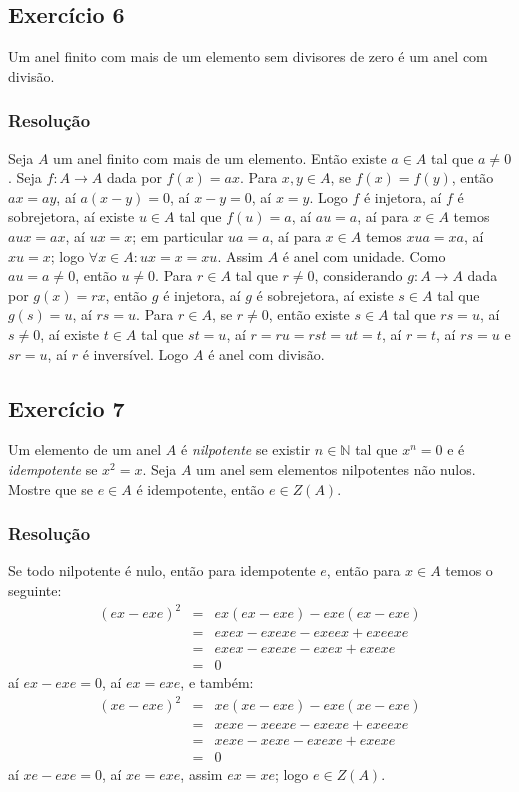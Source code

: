 \documentclass[10pt,a4paper]{article}
\begin{document}
\subsection*{Exercício 6}

Um anel finito com mais de um elemento sem divisores de zero é um anel com divisão.

\subsubsection*{Resolução}

Seja $A$ um anel finito com mais de um elemento. Então existe $a\in A$ tal que $a\neq 0$. Seja $f:A\rightarrow A$ dada por $f(x)=ax$. Para $x,y\in A$, se $f(x)=f(y)$, então $ax=ay$, aí $a(x-y)=0$, aí $x-y=0$, aí $x=y$. Logo $f$ é injetora, aí $f$ é sobrejetora, aí existe $u\in A$ tal que $f(u)=a$, aí $au=a$, aí para $x\in A$ temos $aux=ax$, aí $ux=x$; em particular $ua=a$, aí para $x\in A$ temos $xua=xa$, aí $xu=x$; logo $\forall x\in A:ux=x=xu$. Assim $A$ é anel com unidade. Como $au=a\neq0$, então $u\neq 0$. Para $r\in A$ tal que $r\neq 0$, considerando $g:A\rightarrow A$ dada por $g(x)=rx$, então $g$ é injetora, aí $g$ é sobrejetora, aí existe $s\in A$ tal que $g(s)=u$, aí $rs=u$. Para $r\in A$, se $r\neq 0$, então existe $s\in A$ tal que $rs=u$, aí $s\neq 0$, aí existe $t\in A$ tal que $st=u$, aí $r=ru=rst=ut=t$, aí $r=t$, aí $rs=u$ e $sr=u$, aí $r$ é inversível. Logo $A$ é anel com divisão.

\newpage

\subsection*{Exercício 7}
Um elemento de um anel $A$ é \textit{nilpotente} se existir $n\in\mathbb{N}$ tal que $x^n=0$ e é \textit{idempotente} se $x^2=x$. Seja $A$ um anel sem elementos nilpotentes não nulos. Mostre que se $e\in A$ é idempotente, então $e\in Z(A)$.

\subsubsection*{Resolução}

Se todo nilpotente é nulo, então para idempotente $e$, então para $x\in A$ temos o seguinte:
\[
\begin{array}{rcl}
(ex-exe)^2&=&ex(ex-exe)-exe(ex-exe)\\&=&exex-exexe-exeex+exeexe\\&=&exex-exexe-exex+exexe\\&=&0
\end{array}
\]
aí $ex-exe=0$, aí $ex=exe$, e também:
\[
\begin{array}{rcl}
(xe-exe)^2&=&xe(xe-exe)-exe(xe-exe)\\&=&xexe-xeexe-exexe+exeexe\\&=&xexe-xexe-exexe+exexe\\&=&0
\end{array}
\]
aí $xe-exe=0$, aí $xe=exe$, assim $ex=xe$; logo $e\in Z(A)$.
\end{document}
